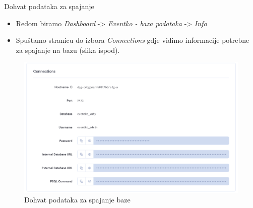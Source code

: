 \begin{packed_enum}
				\item Dohvat podataka za spajanje
				\begin{itemize}
					\item Redom biramo \textit{Dashboard} -> \textit{Eventko - baza podataka} -> \textit{Info}
					\item Spuštamo stranicu do izbora \textit{Connections} gdje vidimo informacije potrebne za spajanje na bazu (slika ispod).
				\end{itemize}
				\begin{figure}[H]
					\includegraphics[width=\textwidth]{Opis deploymenta/Slika2.png}
					\caption{Dohvat podataka za spajanje baze}
				\end{figure}
			

\end{packed_enum}
